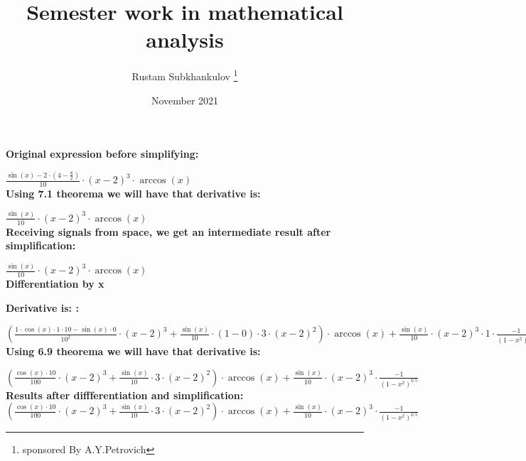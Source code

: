 \documentclass[a4paper, 12pt] {article}
\title{Semester work in mathematical analysis}
\author{Rustam Subkhankulov \thanks{sponsored By A.Y.Petrovich}}
\date{November 2021}
\begin{document}
 
\maketitle
\newpage



 \textbf{Original expression before simplifying:}

\begin{math}
 \frac {\sin(x)-2 \cdot (4- \frac {8}{2})}{10} \cdot (x-2)^3 \cdot \arccos(x)
\end{math} 
 \\ 




 \textbf{Using 7.1 theorema we will have that derivative is:}

\begin{math}
 \frac {\sin(x)}{10} \cdot (x-2)^3 \cdot \arccos(x)
\end{math} \\ 




 \textbf{Receiving signals from space, we get an intermediate result after simplification:}

\begin{math}
 \frac {\sin(x)}{10} \cdot (x-2)^3 \cdot \arccos(x)
\end{math} 
 \\ 


 \textbf{Differentiation by x}



 \textbf{Derivative is: :}

\begin{math}
( \frac {1 \cdot \cos(x) \cdot 1 \cdot 10-\sin(x) \cdot 0}{10^2} \cdot (x-2)^3+ \frac {\sin(x)}{10} \cdot (1-0) \cdot 3 \cdot (x-2)^2) \cdot \arccos(x)+ \frac {\sin(x)}{10} \cdot (x-2)^3 \cdot 1 \cdot  \frac {-1}{(1-x^2)^0.5}
\end{math} 
 \\ 




 \textbf{Using 6.9 theorema we will have that derivative is:}

\begin{math}
( \frac {\cos(x) \cdot 10}{100} \cdot (x-2)^3+ \frac {\sin(x)}{10} \cdot 3 \cdot (x-2)^2) \cdot \arccos(x)+ \frac {\sin(x)}{10} \cdot (x-2)^3 \cdot  \frac {-1}{(1-x^2)^0.5}
\end{math} \\ 



\textbf{Results after diffferentiation and simplification:}
 \begin{math}
( \frac {\cos(x) \cdot 10}{100} \cdot (x-2)^3+ \frac {\sin(x)}{10} \cdot 3 \cdot (x-2)^2) \cdot \arccos(x)+ \frac {\sin(x)}{10} \cdot (x-2)^3 \cdot  \frac {-1}{(1-x^2)^0.5}
 \end{math}
\end{document}
